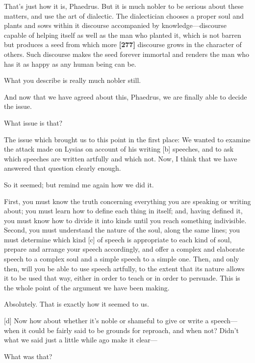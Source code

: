 \saysocrates That's just how it is, Phaedrus. But it is much nobler to be
serious about these matters, and use the art of dialectic. The
dialectician chooses a proper soul and plants and sows within it
discourse accompanied by knowledge---discourse capable of helping itself
as well as the man who planted it, which is not barren but produces a
seed from which more {\bf {[}277{]}} discourse grows in the character of
others. Such discourse makes the seed forever immortal and renders the
man who has it as happy as any human being can be.

\sayphaedrus What you describe is really much nobler still.

\saysocrates And now that we have agreed about this, Phaedrus, we are
finally able to decide the issue.

\sayphaedrus What issue is that?

\saysocrates The issue which brought us to this point in the first place:
We wanted to examine the attack made on Lysias on account of his writing
{[}b{]} speeches, and to ask which speeches are written artfully and
which not. Now, I think that we have answered that question clearly
enough.

\sayphaedrus So it seemed; but remind me again how we did it.

\saysocrates First, you must know the truth concerning everything you are
speaking or writing about; you must learn how to define each thing in
itself; and, having defined it, you must know how to divide it into
kinds until you reach something indivisible. Second, you must understand
the nature of the soul, along the same lines; you must determine which
kind {[}c{]} of speech is appropriate to each kind of soul, prepare and
arrange your speech accordingly, and offer a complex and elaborate
speech to a complex soul and a simple speech to a simple one. Then, and
only then, will you be able to use speech artfully, to the extent that
its nature allows it to be used that way, either in order to teach or in
order to persuade. This is the whole point of the argument we have been
making.

\sayphaedrus Absolutely. That is exactly how it seemed to us.

{[}d{]} \saysocrates Now how about whether it's noble or shameful to give
or write a speech---when it could be fairly said to be grounds for
reproach, and when not? Didn't what we said just a little while ago make
it clear---

\sayphaedrus What was that?


